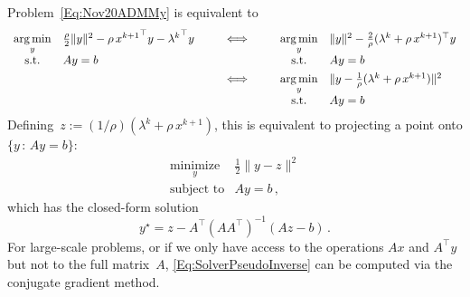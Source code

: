 \documentclass[letter,10pt]{article}
\theoremstyle{definition}
\theoremstyle{nonumberplain}
\newcommand{\mypar}[1]{\bigskip\noindent {\bf #1.}}
\begin{document}
	\mypar{Problem in \boldmath{$y$}}
	Problem~\eqref{Eq:Nov20ADMMy} is equivalent to
	\begin{align*}
			\begin{array}[t]{cl}
				\underset{y}{\arg\min} & \frac{\rho}{2} \|y\|^2 - \rho \,{x^{k+1}}^\top y - {\lambda^k}^\top y \\
				\text{s.t.} & Ay = b
			\end{array}
		\qquad
		&\Longleftrightarrow
		\qquad
			\begin{array}[t]{cl}
				\underset{y}{\arg\min} &  \|y\|^2 - \frac{2}{\rho} (\lambda^k + \rho\, x^{k+1})^\top y \\
				\text{s.t.} & Ay = b
			\end{array}
		\\
		&\Longleftrightarrow
		\qquad
			\begin{array}[t]{cl}
				\underset{y}{\arg\min} &  \|y - \frac{1}{\rho}(\lambda^k + \rho \, x^{k+1})\|^2 \\
				\text{s.t.} & Ay = b
			\end{array}
	\end{align*}
	Defining~$z:= (1/\rho)(\lambda^k + \rho\, x^{k+1})$, this is equivalent to projecting a point onto $\{y \,:\, Ay = b\}$:
	\begin{equation}\label{Eq:Nov20Miny}
		\begin{array}{ll}
			\underset{y}{\text{minimize}} & \frac{1}{2}\|y - z\|^2 \\
			\text{subject to} & Ay = b\,,
		\end{array}
	\end{equation}
	which has the closed-form solution
	\begin{equation}\label{Eq:SolverPseudoInverse}
		y^\star = z - A^\top (A A^\top)^{-1}(Az - b)\,.
	\end{equation}
	For large-scale problems, or if we only have access to the operations $Ax$ and $A^\top y$ but not to the full matrix~$A$, \eqref{Eq:SolverPseudoInverse} can be computed via the conjugate gradient method.
	
\end{document}

